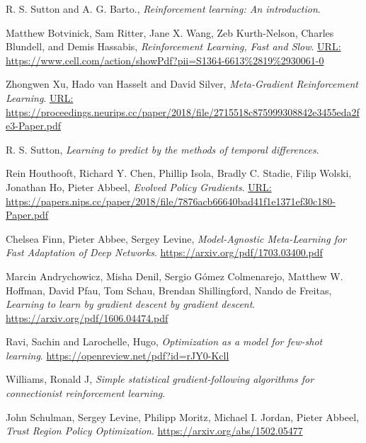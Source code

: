 \documentclass[conference]{IEEEtran}
\begin{document}
	\begin{thebibliography}{1}
		
		
		
		R. S. Sutton and A. G. Barto., \emph{Reinforcement learning: An introduction}.
		
		Matthew Botvinick, Sam Ritter, Jane X. Wang, Zeb Kurth-Nelson, Charles Blundell, and
		Demis Hassabis, \emph{Reinforcement Learning, Fast and Slow}.
		\url{URL: https://www.cell.com/action/showPdf?pii=S1364-6613%2819%2930061-0}
		
		Zhongwen Xu, Hado van Hasselt and David Silver, \emph{Meta-Gradient Reinforcement Learning}.
		\url{URL: https://proceedings.neurips.cc/paper/2018/file/2715518c875999308842e3455eda2fe3-Paper.pdf}
		
		R. S. Sutton, \emph{Learning to predict by the methods of temporal differences}.
		
		Rein Houthooft, Richard Y. Chen, Phillip Isola, Bradly C. Stadie, Filip Wolski, Jonathan Ho, Pieter Abbeel, \emph{Evolved Policy Gradients}.
		\url{URL: https://papers.nips.cc/paper/2018/file/7876acb66640bad41f1e1371ef30c180-Paper.pdf}
		
		Chelsea Finn, Pieter Abbee, Sergey Levine, \emph{Model-Agnostic Meta-Learning for Fast Adaptation of Deep Networks}.
		\url{https://arxiv.org/pdf/1703.03400.pdf}
		
		Marcin Andrychowicz, Misha Denil,  Sergio Gómez Colmenarejo, Matthew W. Hoffman, David Pfau, Tom Schau, Brendan Shillingford,
		Nando de Freitas, \emph{Learning to learn by gradient descent
by gradient descent}.
		\url{https://arxiv.org/pdf/1606.04474.pdf}
		
		Ravi, Sachin and Larochelle, Hugo, \emph{Optimization as a model for few-shot learning}.
		\url{https://openreview.net/pdf?id=rJY0-Kcll}
		
		Williams, Ronald J, \emph{Simple statistical gradient-following
        algorithms for connectionist reinforcement learning}.
		\url{}
		
		John Schulman, Sergey Levine, Philipp Moritz, Michael I. Jordan, Pieter Abbeel, \emph{Trust Region Policy Optimization}.
		\url{https://arxiv.org/abs/1502.05477}
		

\end{thebibliography}
\end{document}
